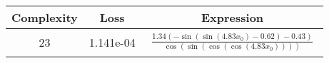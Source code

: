 \begin{center}
        \begin{tabular}{|c|c|c|}
        \hline
        Complexity & Loss & Expression \\
        \hline
        23 & 1.141e-04 & $\begin{aligned}\frac{1.34 \left(- \sin{\left(\sin{\left(4.83 x_{0} \right)} - 0.62 \right)} - 0.43\right)}{\cos{\left(\sin{\left(\cos{\left(\cos{\left(4.83 x_{0} \right)} \right)} \right)} \right)}}\end{aligned}$\\ \hline\end{tabular}
        \end{center}
        
